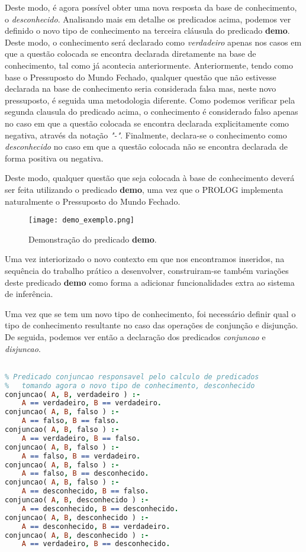 \documentclass[a4paper]{article}
\begin{document}
Deste modo, é agora possível obter uma nova resposta da base de conhecimento, o \emph{desconhecido}. Analisando mais em detalhe os predicados acima, podemos ver definido o novo tipo de conhecimento na terceira cláusula do predicado \textbf{demo}. Deste modo, o conhecimento será declarado como \emph{verdadeiro} apenas nos casos em que a questão colocada se encontra declarada diretamente na base de conhecimento, tal como já acontecia anteriormente. Anteriormente, tendo como base o Pressuposto do Mundo Fechado, qualquer questão que não estivesse declarada na base de conhecimento seria considerada falsa mas, neste novo pressuposto, é seguida uma metodologia diferente. Como podemos verificar pela segunda clausula do predicado acima, o conhecimento é considerado falso apenas no caso em que a questão colocada se encontra declarada explicitamente como negativa, através da notação \textit{"-"}. Finalmente, declara-se o conhecimento como \emph{desconhecido} no caso em que a questão colocada não se encontra declarada de forma positiva ou negativa.

Deste modo, qualquer questão que seja colocada à base de conhecimento deverá ser feita utilizando o predicado \textbf{demo}, uma vez que o PROLOG implementa naturalmente o Pressuposto do Mundo Fechado.

\begin{figure}[!h]
    \centering
    \texttt{[image: demo\_exemplo.png]}
    \caption{Demonstração do predicado \textbf{demo}.}
    \label{fig:demo1}
\end{figure}

Uma vez interiorizado o novo contexto em que nos encontramos inseridos, na sequência do trabalho prático a desenvolver, construiram-se também variações deste predicado \textbf{demo} como forma a adicionar funcionalidades extra ao sistema de inferência.

Uma vez que se tem um novo tipo de conhecimento, foi necessário definir qual o tipo de conhecimento resultante no caso das operações de conjunção e disjunção. De seguida, podemos ver então a declaração dos predicados \textit{conjuncao} e \emph{disjuncao}.

\begin{lstlisting}[language=Prolog, caption=Predicado conjuncao.]

% Predicado conjuncao responsavel pelo calculo de predicados
% 	tomando agora o novo tipo de conhecimento, desconhecido
conjuncao( A, B, verdadeiro ) :-
	A == verdadeiro, B == verdadeiro.
conjuncao( A, B, falso ) :-
	A == falso, B == falso.
conjuncao( A, B, falso ) :-
	A == verdadeiro, B == falso.
conjuncao( A, B, falso ) :-
	A == falso, B == verdadeiro.
conjuncao( A, B, falso ) :-
	A == falso, B == desconhecido.
conjuncao( A, B, falso ) :-
	A == desconhecido, B == falso.
conjuncao( A, B, desconhecido ) :-
	A == desconhecido, B == desconhecido.
conjuncao( A, B, desconhecido ) :-
	A == desconhecido, B == verdadeiro.
conjuncao( A, B, desconhecido ) :-
	A == verdadeiro, B == desconhecido.
	
\end{lstlisting}
\end{document}
